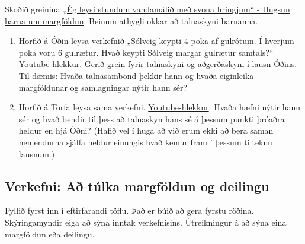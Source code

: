 \documentclass[
  icelandic,
]{book}
\begin{document}
Skoðið greinina \href{https://skolathraedir.is/2021/04/21/eg-leysi-stundum-vandamalid-med-svona-hringjum-hugsun-barna-um-margfoldun/}{„Ég leysi stundum vandamálið með svona hringjum`` - Hugsun barna um margföldun}. Beinum athygli okkar að talnaskyni barnanna.

\begin{enumerate}
\def\labelenumi{\alph{enumi}.}
\item
  Horfið á Óðin leysa verkefnið „Sólveig keypti 4 poka af gulrótum. Í hverjum poka voru 6 gulrætur. Hvað keypti Sólveig margar gulrætur samtals?{}`` \href{https://youtu.be/rqlU-PLoxOs?si=U6lG57jxB6EKkLsn}{Youtube-hlekkur}. Gerið grein fyrir talnaskyni og aðgerðaskyni í lausn Óðins. Til dæmis: Hvaða talnasambönd þekkir hann og hvaða eiginleika margföldunar og samlagningar nýtir hann sér?
\item
  Horfið á Torfa leysa sama verkefni. \href{https://youtu.be/OEZPAQegt9o?si=7VloBBZ5PemM2v_u}{Youtube-hlekkur}. Hvaða hæfni nýtir hann sér og hvað bendir til þess að talnaskyn hans sé á þessum punkti þróaðra heldur en hjá Óðni? (Hafið vel í huga að við erum ekki að bera saman nemendurna sjálfa heldur einungis hvað kemur fram í þessum tilteknu lausnum.)
\end{enumerate}

\subsection{Verkefni: Að túlka margföldun og deilingu}\label{verkefni-tulka-margf-deiling}

Fyllið fyrst inn í eftirfarandi töflu. Það er búið að gera fyrstu röðina. Skýringamyndir eiga að sýna inntak verkefnisins. Útreikningur á að sýna eina margföldun eða deilingu.
\end{document}

